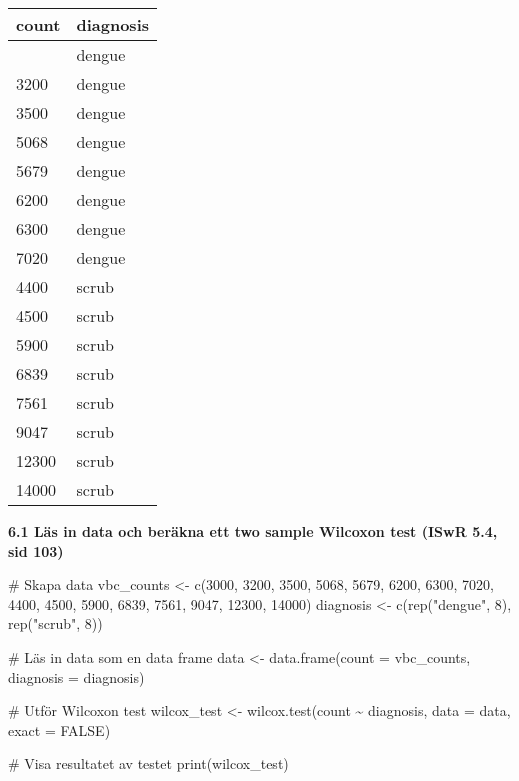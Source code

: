 \documentclass[
  letterpaper,
  DIV=11,
  numbers=noendperiod]{scrartcl}
\newenvironment{Shaded}{\begin{snugshade}}{\end{snugshade}}
\newcommand{\AttributeTok}[1]{\textcolor[rgb]{0.40,0.45,0.13}{#1}}
\newcommand{\CommentTok}[1]{\textcolor[rgb]{0.37,0.37,0.37}{#1}}
\newcommand{\ConstantTok}[1]{\textcolor[rgb]{0.56,0.35,0.01}{#1}}
\newcommand{\DecValTok}[1]{\textcolor[rgb]{0.68,0.00,0.00}{#1}}
\newcommand{\FunctionTok}[1]{\textcolor[rgb]{0.28,0.35,0.67}{#1}}
\newcommand{\NormalTok}[1]{\textcolor[rgb]{0.00,0.23,0.31}{#1}}
\newcommand{\OtherTok}[1]{\textcolor[rgb]{0.00,0.23,0.31}{#1}}
\newcommand{\SpecialCharTok}[1]{\textcolor[rgb]{0.37,0.37,0.37}{#1}}
\newcommand{\StringTok}[1]{\textcolor[rgb]{0.13,0.47,0.30}{#1}}
\begin{document}
\begin{longtable}[]{@{}ll@{}}
\toprule\noalign{}
count & diagnosis \\
\midrule\noalign{}
\endhead
\bottomrule\noalign{}
\endlastfoot
3000 & dengue \\
3200 & dengue \\
3500 & dengue \\
5068 & dengue \\
5679 & dengue \\
6200 & dengue \\
6300 & dengue \\
7020 & dengue \\
4400 & scrub \\
4500 & scrub \\
5900 & scrub \\
6839 & scrub \\
7561 & scrub \\
9047 & scrub \\
12300 & scrub \\
14000 & scrub \\
\end{longtable}

\textbf{6.1 Läs in data och beräkna ett two sample Wilcoxon test (ISwR
5.4, sid 103)}

\begin{Shaded}
\begin{Highlighting}[]
\CommentTok{\# Skapa data}
\NormalTok{vbc\_counts }\OtherTok{\textless{}{-}} \FunctionTok{c}\NormalTok{(}\DecValTok{3000}\NormalTok{, }\DecValTok{3200}\NormalTok{, }\DecValTok{3500}\NormalTok{, }\DecValTok{5068}\NormalTok{, }\DecValTok{5679}\NormalTok{, }\DecValTok{6200}\NormalTok{, }\DecValTok{6300}\NormalTok{, }\DecValTok{7020}\NormalTok{,}
                \DecValTok{4400}\NormalTok{, }\DecValTok{4500}\NormalTok{, }\DecValTok{5900}\NormalTok{, }\DecValTok{6839}\NormalTok{, }\DecValTok{7561}\NormalTok{, }\DecValTok{9047}\NormalTok{, }\DecValTok{12300}\NormalTok{, }\DecValTok{14000}\NormalTok{)}
\NormalTok{diagnosis }\OtherTok{\textless{}{-}} \FunctionTok{c}\NormalTok{(}\FunctionTok{rep}\NormalTok{(}\StringTok{"dengue"}\NormalTok{, }\DecValTok{8}\NormalTok{), }\FunctionTok{rep}\NormalTok{(}\StringTok{"scrub"}\NormalTok{, }\DecValTok{8}\NormalTok{))}

\CommentTok{\# Läs in data som en data frame}
\NormalTok{data }\OtherTok{\textless{}{-}} \FunctionTok{data.frame}\NormalTok{(}\AttributeTok{count =}\NormalTok{ vbc\_counts, }\AttributeTok{diagnosis =}\NormalTok{ diagnosis)}

\CommentTok{\# Utför Wilcoxon test}
\NormalTok{wilcox\_test }\OtherTok{\textless{}{-}} \FunctionTok{wilcox.test}\NormalTok{(count }\SpecialCharTok{\textasciitilde{}}\NormalTok{ diagnosis, }\AttributeTok{data =}\NormalTok{ data, }\AttributeTok{exact =} \ConstantTok{FALSE}\NormalTok{)}

\CommentTok{\# Visa resultatet av testet}
\FunctionTok{print}\NormalTok{(wilcox\_test)}
\end{Highlighting}
\end{Shaded}
\end{document}

